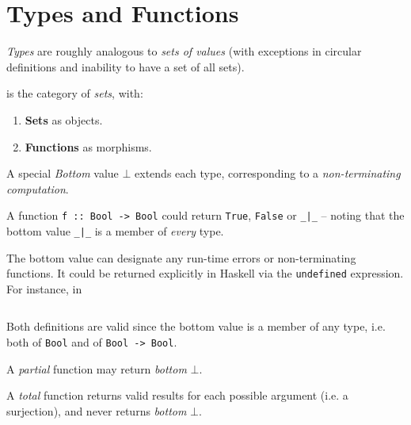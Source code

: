 \section{Types and Functions}

\begin{definition}[Types]
    \textit{Types} are roughly analogous to \textit{sets of values} (with exceptions in circular definitions and inability to have a set of all sets).
\end{definition}

\begin{definition}
     is the category of \textit{sets}, with:
    \begin{enumerate}
        \item \textbf{Sets} as objects.
        \item \textbf{Functions} as morphisms.
    \end{enumerate}
\end{definition}

\begin{definition}[Bottom]
    A special \textit{Bottom} value $\bot$ extends each type, corresponding to a \textit{non-terminating computation}.
\end{definition}

\begin{remark}
    A function \texttt{f :: Bool -> Bool} could return \texttt{True}, \texttt{False} or \texttt{_|_} -- noting that the bottom value \texttt{_|_} is a member of \textit{every} type.
    
    The bottom value can designate any run-time errors or non-terminating functions. It could be returned explicitly in Haskell via the \texttt{undefined} expression. For instance, in
    \inputminted{hs}{content/code-listings/bottom.hs}
    
    Both definitions are valid since the bottom value is a member of any type, i.e. both of  \texttt{Bool} and of \texttt{Bool -> Bool}.
\end{remark}

\begin{definition}
    A \textit{partial} function may return \textit{bottom} $\bot$.
\end{definition}

\begin{definition}
    A \textit{total} function returns valid results for each possible argument (i.e. a surjection), and never returns \textit{bottom} $\bot$.
\end{definition}

